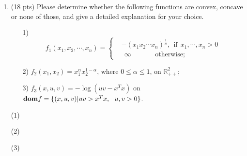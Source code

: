 \documentclass[10pt]{article}
\begin{document}
\begin{enumerate}
\newpage

\item {\color{red} (18 pts)} Please determine whether the following functions are convex, concave or none of those, and give a detailed explanation for your choice.
\begin{itemize}
    \item[1)] 
     \begin{equation*}
     f_1(x_1,x_2,\cdots,x_n)=
      \begin{cases}
         &-(x_1x_2\cdots x_n)^{\frac{1}n},~~ \text{if}~~x_1,\cdots,x_n>0\\
         &~~\infty ~~~~~~~~~~~~~~~~\text{otherwise};\
       \end{cases}
     \end{equation*}
    \item[2)] $f_2(x_1,x_2)= x_1^\alpha x_2^{1-\alpha}$, where $0\leq\alpha\leq1$, on $\mathbb{R}_{++}^2$;
    \item[3)] $f_3(x,u,v)=-\log(uv-x^Tx)$ on ${\bf dom} f =\{(x,u,v)|uv>x^Tx,~~u,v>0\}$.
\end{itemize}

(1)




(2)




(3)







\end{enumerate}
\end{document}
